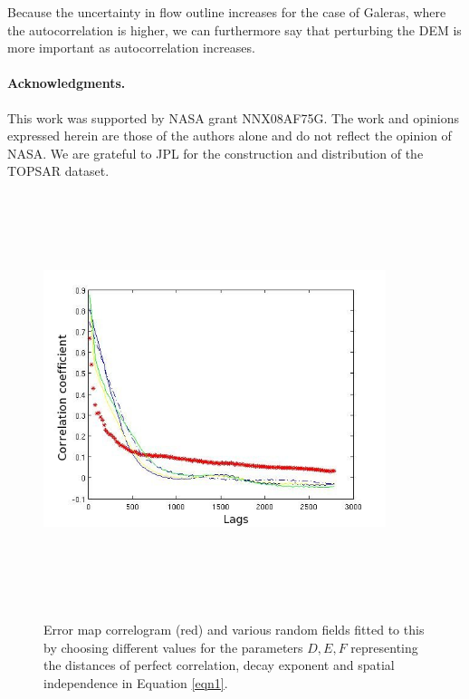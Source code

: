 \documentclass[12pt]{article}
\newcommand{\Pic}[2][0.85]{\begin{center}\texttt{[image: \#2]}
 \end{center} }
\begin{document}
Because the uncertainty in flow outline increases for the case of
Galeras, where the autocorrelation is higher, we can furthermore say
that perturbing the DEM is more important as autocorrelation
increases.

\paragraph{Acknowledgments.}  This work was supported by NASA grant
NNX08AF75G.  The work and opinions expressed herein are those of the
authors alone and do not reflect the opinion of NASA.  We are grateful
to JPL for the construction and distribution of the TOPSAR dataset.

	
		

\begin{figure}[H]
\centering
	\includegraphics[width=10cm,height=12cm,keepaspectratio]{figs/mammoth_error_correl.jpg}\\       
        \caption{ Error map correlogram (red) and various random
          fields fitted to this by choosing different values for the
          parameters $D,E,F$ representing the distances of perfect
          correlation, decay exponent and spatial independence in
          Equation \ref{eqn1}.}
\label{fig1}  
\end{figure}
\end{document}
